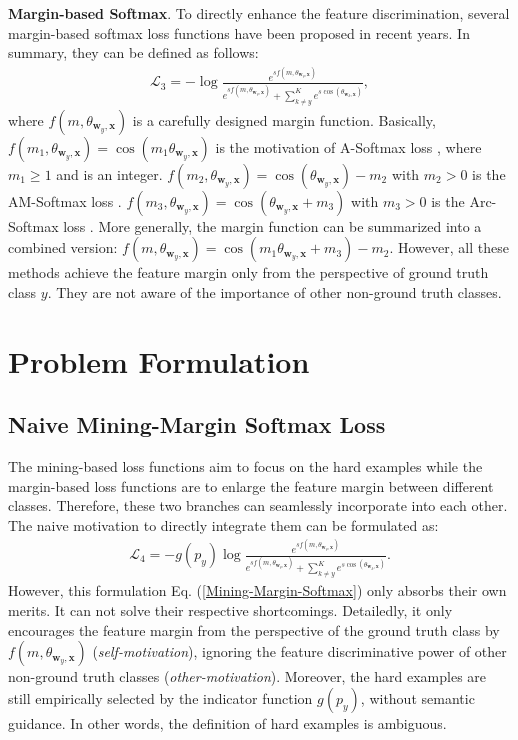 \documentclass[10pt,twocolumn,letterpaper]{article}
\begin{document}
\noindent \textbf{Margin-based Softmax}. To directly enhance the feature discrimination, several margin-based softmax loss functions \cite{SphereFace,EM-Softmax,AM-Softmax,Arc-Softmax} have been proposed in recent years. In summary, they can be defined as follows:
\begin{equation}\label{Margin-Softmax}
\begin{aligned}
\mathcal{L}_3 = - \log\frac{e^{sf(m,\theta_{\bm{w}_y,\bm{x}})}}{e^{sf(m,\theta_{\bm{w}_y,\bm{x}})}+\sum_{k\ne y}^Ke^{s\cos(\theta_{\bm{w}_k,\bm{x}})}},
\end{aligned}
\end{equation}
where $f(m,\theta_{\bm{w}_y,\bm{x}})$ is a carefully designed margin function. Basically,
$f(m_1,\theta_{\bm{w}_y,\bm{x}})= \cos(m_1\theta_{\bm{w}_y,\bm{x}})$ is the motivation of A-Softmax loss \cite{SphereFace}, where $m_1\ge1$ and is an integer. $f(m_2,\theta_{\bm{w}_y,\bm{x}})= \cos(\theta_{\bm{w}_y,\bm{x}})-m_2$ with $m_2 >0$ is the AM-Softmax loss \cite{AM-Softmax}. $f(m_3,\theta_{\bm{w}_y,\bm{x}})= \cos(\theta_{\bm{w}_y,\bm{x}}+m_3)$ with $m_3>0$ is the Arc-Softmax loss \cite{Arc-Softmax}. More generally, the margin function can be summarized into a combined version: $f(m,\theta_{\bm{w}_y,\bm{x}})=\cos(m_1\theta_{\bm{w}_y,\bm{x}} + m_3) - m_2$. However, all these methods achieve the feature margin only from the perspective of ground truth class $y$. They are not aware of the importance of other non-ground truth classes.

\section{Problem Formulation} \label{main}
\subsection{Naive Mining-Margin Softmax Loss}
The mining-based loss functions aim to focus on the hard examples while the margin-based loss functions are to enlarge the feature margin between different classes. Therefore, these two branches can seamlessly incorporate into each other. The naive motivation to directly integrate them can be formulated as:
\begin{equation}\label{Mining-Margin-Softmax}
\begin{aligned}
\mathcal{L}_4 = -g(p_y) \log\frac{e^{sf(m,\theta_{\bm{w}_y,\bm{x}})}}{e^{sf(m,\theta_{\bm{w}_y,\bm{x}})}+\sum_{k\ne y}^Ke^{s\cos(\theta_{\bm{w}_k,\bm{x}})}}.
\end{aligned}
\end{equation}
However, this formulation Eq. (\ref{Mining-Margin-Softmax}) only absorbs their own merits. It can not solve their respective shortcomings. Detailedly, it only encourages the feature margin from the perspective of the ground truth class by $f(m,\theta_{\bm{w}_y,\bm{x}})$ (\textit{self-motivation}), ignoring the feature discriminative power of other non-ground truth classes (\textit{other-motivation}). Moreover, the hard examples are still empirically selected by the indicator function $g(p_y)$, without semantic guidance. In other words, the definition of hard examples is ambiguous.
\end{document}
